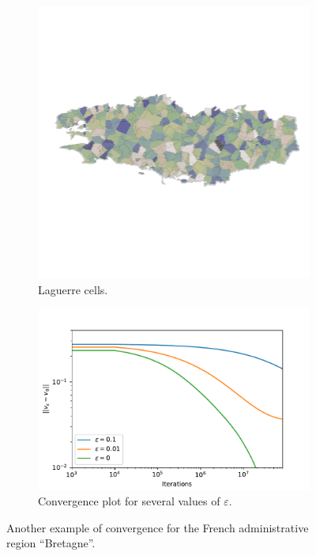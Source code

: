 \begin{figure}[h]
\begin{subfigure}{.35\linewidth}
        \includegraphics[width=\linewidth]{figures/opti_rennes_cells.jpg}
        \caption{Laguerre cells.}
    \end{subfigure}
    \begin{subfigure}{.49\linewidth}
        \centering
        \includegraphics[width=\linewidth]{figures/semi_discrete_eps2.pdf}
        \caption{Convergence plot for several values of $\varepsilon$.}
    \end{subfigure}
    \caption{Another example of convergence for the French administrative region ``Bretagne''.}
    \label{fig:loire}
\end{figure}